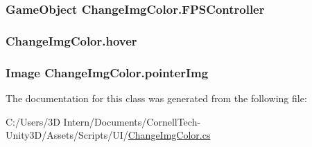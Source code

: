 \subsubsection[{\texorpdfstring{F\+P\+S\+Controller}{FPSController}}]{\setlength{\rightskip}{0pt plus 5cm}Game\+Object Change\+Img\+Color.\+F\+P\+S\+Controller}\hypertarget{class_change_img_color_af0934ecd3c6b6e3b6a098748f4cff84e}{}\label{class_change_img_color_af0934ecd3c6b6e3b6a098748f4cff84e}
\subsubsection[{\texorpdfstring{hover}{hover}}]{ Change\+Img\+Color.\+hover}\hypertarget{class_change_img_color_a8624af46aaa3a3a668a55137cc67bd06}{}\label{class_change_img_color_a8624af46aaa3a3a668a55137cc67bd06}
\subsubsection[{\texorpdfstring{pointer\+Img}{pointerImg}}]{\setlength{\rightskip}{0pt plus 5cm}Image Change\+Img\+Color.\+pointer\+Img}\hypertarget{class_change_img_color_a7036b7621e8c305bbc226dcd9b59527b}{}\label{class_change_img_color_a7036b7621e8c305bbc226dcd9b59527b}


The documentation for this class was generated from the following file\+:\begin{DoxyCompactItemize}
\item 
C\+:/\+Users/3\+D Intern/\+Documents/\+Cornell\+Tech-\/\+Unity3\+D/\+Assets/\+Scripts/\+U\+I/\hyperlink{_change_img_color_8cs}{Change\+Img\+Color.\+cs}\end{DoxyCompactItemize}
